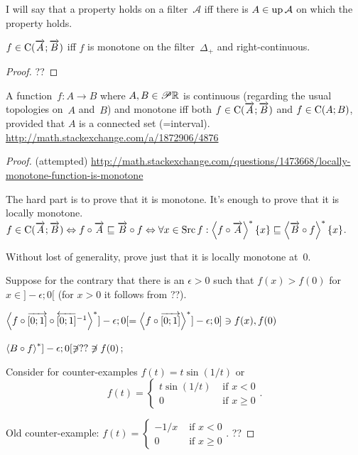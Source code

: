 I will say that a property holds on a filter~$\mathcal{A}$ iff there is $A\in\operatorname{up}\mathcal{A}$ on which the property holds.

\begin{prop}
$f\in\mathrm{C}(\overrightarrow{A};\overrightarrow{B})$ iff
$f$ is monotone on the filter~$\Delta_+$ and right-continuous.
\end{prop}

\begin{proof}
??
\end{proof}

\begin{conjecture}
A function~$f:A\rightarrow B$ where $A,B\in\mathscr{P}\mathbb{R}$ is continuous (regarding the usual topologies on~$A$ and~$B$) and monotone iff
both $f\in\mathrm{C}(\overrightarrow{A};\overrightarrow{B})$ and $f\in\mathrm{C}(A;B)$, provided that $A$ is a connected set (=interval).
\url{http://math.stackexchange.com/a/1872906/4876}
\end{conjecture}

\begin{proof} (attempted)
\url{http://math.stackexchange.com/questions/1473668/locally-monotone-function-is-monotone}

The hard part is to prove that it is monotone. It's enough to prove that it is locally monotone.
$f\in\mathrm{C}(\overrightarrow{A};\overrightarrow{B}) \Leftrightarrow
f\circ\overrightarrow{A} \sqsubseteq \overrightarrow{B}\circ f \Leftrightarrow
\forall x\in\operatorname{Src} f:\left\langle f\circ\overrightarrow{A}\right\rangle ^{\ast}\{x\} \sqsubseteq \left\langle \overrightarrow{B}\circ f\right\rangle ^{\ast}\{x\}
$.

Without lost of generality, prove just that it is locally monotone at~$0$.


Suppose for the contrary
that there is an $\epsilon>0$ such that $f(x) > f(0)$ for $x\in]-\epsilon;0[$ (for $x>0$ it follows from ??).

$\left\langle f\circ\overrightarrow{[0;1]}\circ\overleftarrow{[0;1]}^{-1}\right\rangle ^{\ast} ]-\epsilon;0[ =
\left\langle f\circ\overrightarrow{[0;1]}\right\rangle ^{\ast} ]-\epsilon;0] \ni f(x), f(0)$

$\left\langle B\circ f\right\rangle ^{\ast} ]-\epsilon;0[ \not\ni ?? \not\ni f(0)$;

Consider for counter-examples $f(t) = t\sin(1/t)$ or
\[ f(t) = \begin{cases}t\sin(1/t)&\text{ if }x<0\\0&\text{ if }x\ge 0\end{cases}. \]

Old counter-example: $f(t) = \begin{cases}-1/x&\text{ if }x<0\\0&\text{ if }x\ge 0\end{cases}$.
??
\end{proof}


